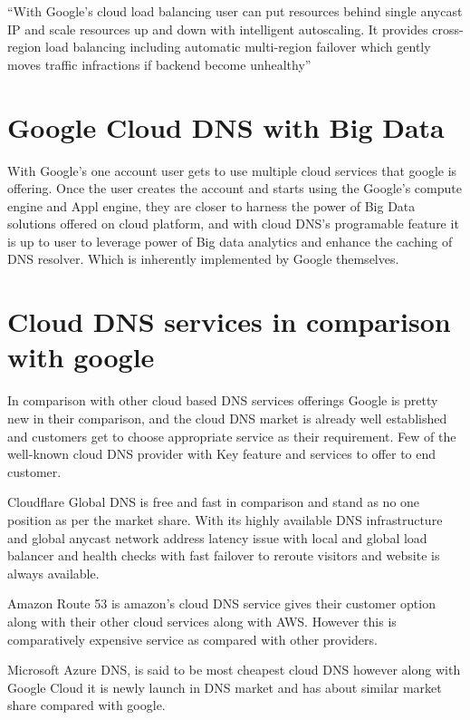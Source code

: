 \documentclass[9pt,twocolumn,twoside]{styles/osajnl}
\begin{document}
“With Google’s cloud load balancing user can put resources behind single anycast IP and scale resources up and down with intelligent autoscaling. It provides cross-region load balancing including automatic multi-region failover which gently moves traffic infractions if backend become unhealthy”\cite{dns-load-balancing}

\section{Google Cloud DNS with Big Data}
With Google’s one account user gets to use multiple cloud services that google is offering. Once the user creates the account and starts using the Google’s compute engine and Appl engine, they are closer to harness the power of Big Data solutions offered on cloud platform, and with cloud DNS’s programable feature it is up to user to leverage power of Big data analytics and enhance the caching of DNS resolver. Which is inherently implemented by Google themselves.

\section{Cloud DNS services in comparison with google}
In comparison with other cloud based DNS services offerings Google is pretty new in their comparison, and the cloud DNS market is already well established and customers get to choose appropriate service as their requirement. Few of the well-known cloud DNS provider with Key feature and services to offer to end customer.

Cloudflare Global DNS is free and fast in comparison and stand as no one position as per the market share. With its highly available DNS infrastructure and global anycast network address latency issue with local and global load balancer and health checks with fast failover to reroute visitors and website is always available.

Amazon Route 53 is amazon’s cloud DNS service gives their customer option along with their other cloud services along with AWS. However this is comparatively expensive service as compared with other providers.

Microsoft Azure DNS, is said to be most cheapest cloud DNS however along with Google Cloud it is newly launch in DNS market and has about similar market share compared with google.
\end{document}
